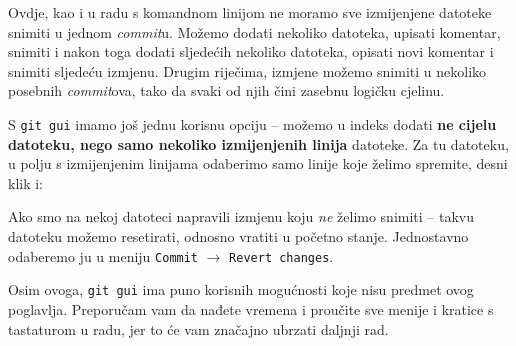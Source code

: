 Ovdje, kao i u radu s komandnom linijom ne moramo sve izmijenjene datoteke snimiti u jednom \emph{commit}u. 
Možemo dodati nekoliko datoteka, upisati komentar, snimiti i nakon toga dodati sljedećih nekoliko datoteka, opisati novi komentar i snimiti sljedeću izmjenu.
Drugim riječima, izmjene možemo snimiti u nekoliko posebnih \emph{commit}ova, tako da svaki od njih čini zasebnu logičku cjelinu.

S \verb+git gui+ imamo još jednu korisnu opciju -- možemo u indeks dodati \textbf{ne cijelu datoteku, nego samo nekoliko izmijenjenih linija} datoteke.
Za tu datoteku, u polju s izmijenjenim linijama odaberimo samo linije koje želimo spremite, desni klik i:


Ako smo na nekoj datoteci napravili izmjenu koju \emph{ne} želimo snimiti -- takvu datoteku možemo resetirati, odnosno vratiti u početno stanje. 
Jednostavno odaberemo ju u meniju \verb+Commit+ $\rightarrow$ \verb+Revert changes+.

Osim ovoga, \verb+git gui+ ima puno korisnih mogućnosti koje nisu predmet ovog poglavlja.
Preporučam vam da nađete vremena i proučite sve menije i kratice s tastaturom u radu, jer to će vam značajno ubrzati daljnji rad.



